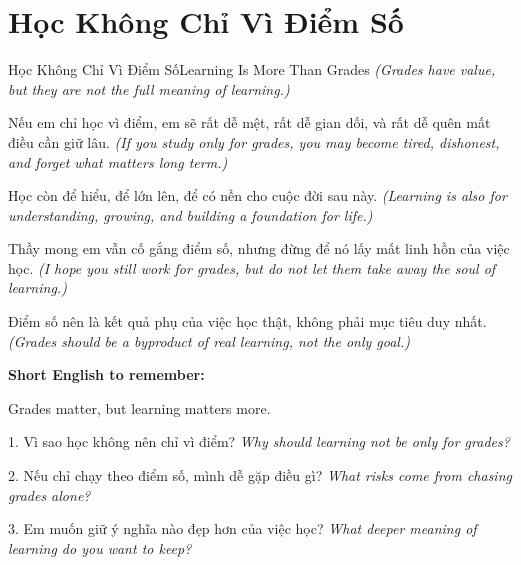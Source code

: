 \section{Học Không Chỉ Vì Điểm Số}
\begin{truyen}{Học Không Chỉ Vì Điểm Số}{Learning Is More Than Grades}
\textit{(Grades have value, but they are not the full meaning of learning.)}

Nếu em chỉ học vì điểm, em sẽ rất dễ mệt, rất dễ gian dối, và rất dễ quên mất điều cần giữ lâu.
\textit{(If you study only for grades, you may become tired, dishonest, and forget what matters long term.)}

Học còn để hiểu, để lớn lên, để có nền cho cuộc đời sau này.
\textit{(Learning is also for understanding, growing, and building a foundation for life.)}

Thầy mong em vẫn cố gắng điểm số, nhưng đừng để nó lấy mất linh hồn của việc học.
\textit{(I hope you still work for grades, but do not let them take away the soul of learning.)}
\end{truyen}

\begin{baihoc}
Điểm số nên là kết quả phụ của việc học thật, không phải mục tiêu duy nhất.
\textit{(Grades should be a byproduct of real learning, not the only goal.)}
\end{baihoc}

\begin{ghinhoanh}
\textbf{Short English to remember:}

Grades matter, but learning matters more.

\end{ghinhoanh}

\begin{tuhocnhanh}
1. Vì sao học không nên chỉ vì điểm? \textit{Why should learning not be only for grades?}

2. Nếu chỉ chạy theo điểm số, mình dễ gặp điều gì? \textit{What risks come from chasing grades alone?}

3. Em muốn giữ ý nghĩa nào đẹp hơn của việc học? \textit{What deeper meaning of learning do you want to keep?}
\end{tuhocnhanh}
\ngancach

